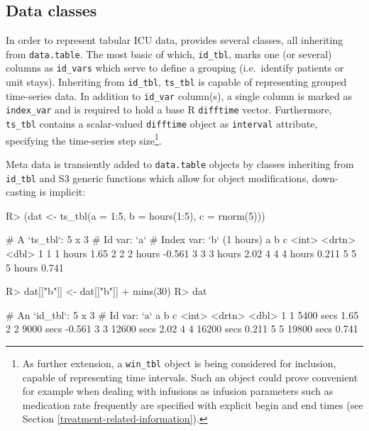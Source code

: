 \documentclass[
  notitle]{jss}
\begin{document}
\hypertarget{data-classes}{%
\subsection{Data classes}\label{data-classes}}

In order to represent tabular ICU data,  provides several
classes, all inheriting from \texttt{data.table}. The most basic of
which, \texttt{id\_tbl}, marks one (or several) columns as
\texttt{id\_vars} which serve to define a grouping (i.e.~identify
patients or unit stays). Inheriting from \texttt{id\_tbl},
\texttt{ts\_tbl} is capable of representing grouped time-series data. In
addition to \texttt{id\_var} column(s), a single column is marked as
\texttt{index\_var} and is required to hold a base R \texttt{difftime}
vector. Furthermore, \texttt{ts\_tbl} contains a scalar-valued
\texttt{difftime} object as \texttt{interval} attribute, specifying the
time-series step size\footnote{As further extension, a \texttt{win\_tbl}
  object is being considered for inclusion, capable of representing time
  intervals. Such an object could prove convenient for example when
  dealing with infusions as infusion parameters such as medication rate
  frequently are specified with explicit begin and end times (see
  Section \ref{treatment-related-information}).}.

Meta data is transiently added to \texttt{data.table} objects by classes
inheriting from \texttt{id\_tbl} and S3 generic functions which allow
for object modifications, down-casting is implicit:

\begin{CodeChunk}
\begin{CodeInput}
R> (dat <- ts_tbl(a = 1:5, b = hours(1:5), c = rnorm(5)))
\end{CodeInput}
\begin{CodeOutput}
# A `ts_tbl`: 5 x 3
# Id var:     `a`
# Index var:  `b` (1 hours)
      a b            c
  <int> <drtn>   <dbl>
1     1 1 hours  1.65
2     2 2 hours -0.561
3     3 3 hours  2.02
4     4 4 hours  0.211
5     5 5 hours  0.741
\end{CodeOutput}
\begin{CodeInput}
R> dat[["b"]] <- dat[["b"]] + mins(30)
R> dat
\end{CodeInput}
\begin{CodeOutput}
# An `id_tbl`: 5 x 3
# Id var:      `a`
      a b               c
  <int> <drtn>      <dbl>
1     1  5400 secs  1.65
2     2  9000 secs -0.561
3     3 12600 secs  2.02
4     4 16200 secs  0.211
5     5 19800 secs  0.741
\end{CodeOutput}
\end{CodeChunk}
\end{document}
